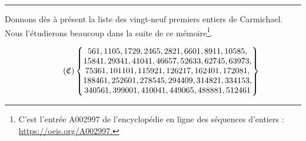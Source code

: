\begin{adjustwidth}{1cm}{1cm}
	\begin{center}
		\vspace{1cm}
		\rule{11cm}{0.5pt}
		\vspace{1cm}

		Donnons dès à présent la liste des vingt-neuf premiers entiers de Carmichael. Nous l'étudierons beaucoup dans la suite de ce mémoire\footnote{C’est l'entrée A002997 de l'encyclopédie en ligne des séquences d’entiers : \url{https://oeis.org/A002997.}}.

		\begin{equation}\tag{$\mathfrak{C}$}\label{liste-carmichael}
			\begin{Bmatrix}
				561,1105,1729,2465,2821,6601,8911,10585, \\
				15841, 29341, 41041, 46657, 52633, 62745, 63973, \\
				75361, 101101, 115921, 126217, 162401, 172081, \\
				188461, 252601, 278545, 294409, 314821, 334153, \\
				340561, 399001, 410041, 449065, 488881, 512461
			\end{Bmatrix}
		\end{equation}
		\vspace{1em}
	\end{center}
\end{adjustwidth}

